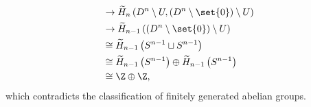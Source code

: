 \documentclass[10pt]{mypackage}
\begin{document}
\begin{solution}
\begin{align*}
                                              &\rightarrow \widetilde{H}_n\left( D^n\setminus U,\left( D^n\setminus\set{0} \right)\setminus U \right)\\
                                              &\rightarrow \widetilde{H}_{n-1}\left( \left( D^n\setminus\set{0} \right)\setminus U \right)\\
                                              &\cong \widetilde{H}_{n-1}\left( S^{n-1}\sqcup S^{n-1} \right)\\
                                              &\cong \widetilde{H}_{n-1}\left( S^{n-1} \right)\oplus \widetilde{H}_{n-1}\left( S^{n-1} \right)\\
                                              &\cong \Z\oplus \Z,
  \end{align*}
  which contradicts the classification of finitely generated abelian groups.
\end{solution}
\end{document}
